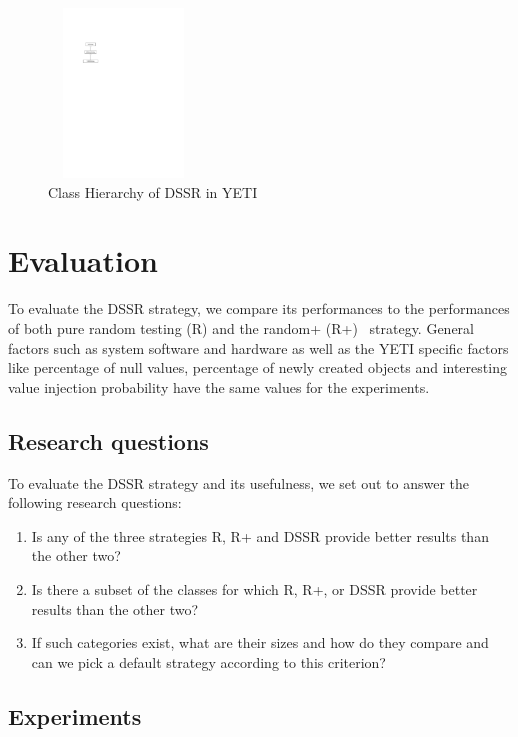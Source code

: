 \documentclass{acm_proc_article-sp}
\begin{document}
\begin{figure}[h]
\centering
\includegraphics[width=4cm,height=4.5cm]{hierarchy.pdf}
\caption{Class Hierarchy of DSSR in YETI}
\label{fig:hierarchyofDSSR}
\end{figure}







\section{Evaluation}\label{sec:eval}

To evaluate the DSSR strategy, we compare its performances to the performances of both pure random testing (R) and the random+ (R+)~\cite{Leitner2007} strategy. General factors such as system software and hardware as well as the YETI specific factors like percentage of null values, percentage of newly created objects and interesting value injection probability have the same values for the experiments.

\subsection{Research questions}
To evaluate the DSSR strategy and its usefulness, we set out to answer the following research questions:
\begin{enumerate}
\item Is any of the three strategies R, R+ and DSSR provide better results than the other two?
\item Is there a subset of the classes for which R, R+, or DSSR provide better results than the other two?
\item If such categories exist, what are their sizes and how do they compare and can we pick a default strategy according to this criterion?
\end{enumerate}



\subsection{Experiments}
\end{document}
